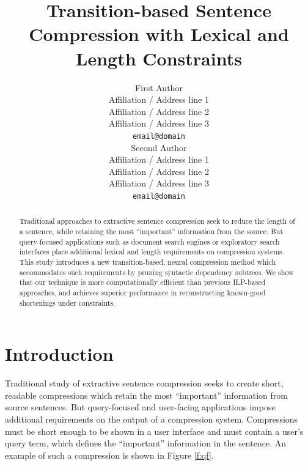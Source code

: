 \documentclass[11pt,a4paper]{article}
\title{Transition-based Sentence Compression with Lexical and Length Constraints}
\author{First Author \\
  Affiliation / Address line 1 \\
  Affiliation / Address line 2 \\
  Affiliation / Address line 3 \\
  {\tt email@domain} \\\And
  Second Author \\
  Affiliation / Address line 1 \\
  Affiliation / Address line 2 \\
  Affiliation / Address line 3 \\
  {\tt email@domain} \\}
\date{}
\newcommand{\ahcomment}[1]{\textcolor{blue}{[#1 -AH]}}
\begin{document}
\maketitle




\begin{abstract}
Traditional approaches to extractive sentence compression seek to reduce the length of a sentence, while retaining the most ``important'' information from the source. But query-focused applications such as document search engines or exploratory search interfaces place additional lexical and length requirements on compression systems. This study introduces a new transition-based, neural compression method which accommodates such requirements by pruning syntactic dependency subtrees.  We show that our technique is more computationally efficient than previous ILP-based approaches, and achieves superior performance in reconstructing known-good shortenings under constraints.
\end{abstract}

\section{Introduction}

Traditional study of extractive sentence compression seeks to create short, readable compressions which retain the most ``important'' information from source sentences. But query-focused and user-facing applications impose additional requirements on the output of a compression system. Compressions must be short enough to be shown in a user interface and must contain a user's query term, which defines the ``important'' information in the sentence. An example of such a compression is shown in Figure \ref{f:qf}.
\end{document}
